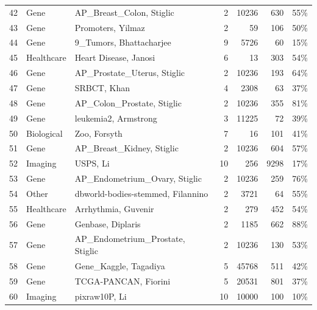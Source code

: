 \documentclass[preprint,12pt,authoryear]{elsarticle}
\begin{document}
{\begin{longtable}{@{}r p{1.9cm} p{6.7cm} r r r r@{}}
42 & Gene & AP\_Breast\_Colon, Stiglic \citeyearpar{stiglic2010stability} & 2 & 10236 & 630 & 55\% \\
43 & Gene & Promoters, Yilmaz \citeyearpar{yilmaz2023mucsteri} & 2 & 59 & 106 & 50\% \\
44 & Gene & 9\_Tumors, Bhattacharjee \citeyearpar{bhattacharjee2001classification} & 9 & 5726 & 60 & 15\% \\
45 & Healthcare & Heart Disease, Janosi \citeyearpar{heart_disease_45} & 6 & 13 & 303 & 54\% \\
46 & Gene & AP\_Prostate\_Uterus, Stiglic \citeyearpar{stiglic2010stability} & 2 & 10236 & 193 & 64\% \\
47 & Gene & SRBCT, Khan \citeyearpar{khan2001classification} & 4 & 2308 & 63 & 37\% \\
48 & Gene & AP\_Colon\_Prostate, Stiglic \citeyearpar{stiglic2010stability} & 2 & 10236 & 355 & 81\% \\
49 & Gene & leukemia2, Armstrong \citeyearpar{armstrong2002mll} & 3 & 11225 & 72 & 39\% \\
50 & Biological & Zoo, Forsyth \citeyearpar{zoo_111} & 7 & 16 & 101 & 41\% \\
51 & Gene & AP\_Breast\_Kidney, Stiglic \citeyearpar{stiglic2010stability} & 2 & 10236 & 604 & 57\% \\
52 & Imaging & USPS, Li \citeyearpar{li2017feature} & 10 & 256 & 9298 & 17\% \\
53 & Gene & AP\_Endometrium\_Ovary, Stiglic \citeyearpar{stiglic2010stability} & 2 & 10236 & 259 & 76\% \\
54 & Other & dbworld-bodies-stemmed, Filannino \citeyearpar{filannino2011dbworld} & 2 & 3721 & 64 & 55\% \\
55 & Healthcare & Arrhythmia, Guvenir \citeyearpar{arrhythmia_5} & 2 & 279 & 452 & 54\% \\
56 & Gene & Genbase, Diplaris \citeyearpar{diplaris2005protein} & 2 & 1185 & 662 & 88\% \\
57 & Gene & AP\_Endometrium\_Prostate, Stiglic \citeyearpar{stiglic2010stability} & 2 & 10236 & 130 & 53\% \\
58 & Gene & Gene\_Kaggle, Tagadiya \citeyearpar{tagadiya_genesdata} & 5 & 45768 & 511 & 42\% \\
59 & Gene & TCGA-PANCAN, Fiorini \citeyearpar{gene_expression_cancer_rna-seq_401} & 5 & 20531 & 801 & 37\% \\
60 & Imaging & pixraw10P, Li \citeyearpar{li2017feature} & 10 & 10000 & 100 & 10\% \\

\end{longtable}}
\end{document}
